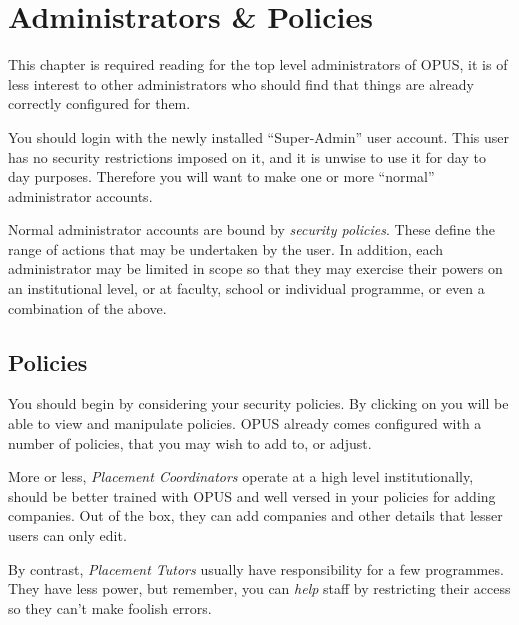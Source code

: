 \documentclass[12 pt]{book}
\begin{document}
\chapter{Administrators \& Policies}

This chapter is required reading for the top level administrators of OPUS, it
is of less interest to other administrators who should find that things are
already correctly configured for them.

You should login with the newly installed ``Super-Admin'' user account. This
user has no security restrictions imposed on it, and it is unwise to use it
for day to day purposes. Therefore you will want to make one or more ``normal''
administrator accounts.


Normal administrator accounts are bound by \emph{security policies}. These
define the range of actions that may be undertaken by the user. In addition, 
each administrator may be limited in scope so that they may exercise their
powers on an institutional level, or at faculty, school or individual
programme, or even a combination of the above.

\section{Policies}
\label{Policies}

You should begin by considering your security policies. By clicking on
 you will be able to view and manipulate
policies. OPUS already comes configured with a number of policies, that you may
wish to add to, or adjust.

More or less, \emph{Placement Coordinators} operate at a high level
institutionally, should be better trained with OPUS and well versed in your
policies for adding companies. Out of the box, they can add companies and other
details that lesser users can only edit.

By contrast, \emph{Placement Tutors} usually have responsibility for a few
programmes. They have less power, but remember, you can \emph{help} staff by
restricting their access so they can't make foolish errors.
\end{document}
